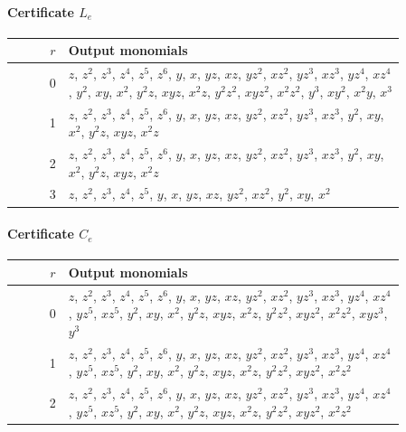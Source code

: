 \documentclass[11pt]{amsart}
\theoremstyle{definition}
\theoremstyle{remark}
\numberwithin{equation}{section}
\begin{document}
\paragraph*{Certificate $L_e$}
\begin{center}
\begin{tabular}{rp{0.86\linewidth}}
$r$ & Output monomials\\\hline
0 & \(z\), \(z^{2}\), \(z^{3}\), \(z^{4}\), \(z^{5}\), \(z^{6}\), \(y\), \(x\), \(yz\), \(xz\), \(yz^{2}\), \(xz^{2}\), \(yz^{3}\), \(xz^{3}\), \(yz^{4}\), \(xz^{4}\), \(y^{2}\), \(xy\), \(x^{2}\), \(y^{2}z\), \(xyz\), \(x^{2}z\), \(y^{2}z^{2}\), \(xyz^{2}\), \(x^{2}z^{2}\), \(y^{3}\), \(xy^{2}\), \(x^{2}y\), \(x^{3}\)\\
1 & \(z\), \(z^{2}\), \(z^{3}\), \(z^{4}\), \(z^{5}\), \(z^{6}\), \(y\), \(x\), \(yz\), \(xz\), \(yz^{2}\), \(xz^{2}\), \(yz^{3}\), \(xz^{3}\), \(y^{2}\), \(xy\), \(x^{2}\), \(y^{2}z\), \(xyz\), \(x^{2}z\)\\
2 & \(z\), \(z^{2}\), \(z^{3}\), \(z^{4}\), \(z^{5}\), \(z^{6}\), \(y\), \(x\), \(yz\), \(xz\), \(yz^{2}\), \(xz^{2}\), \(yz^{3}\), \(xz^{3}\), \(y^{2}\), \(xy\), \(x^{2}\), \(y^{2}z\), \(xyz\), \(x^{2}z\)\\
3 & \(z\), \(z^{2}\), \(z^{3}\), \(z^{4}\), \(z^{5}\), \(y\), \(x\), \(yz\), \(xz\), \(yz^{2}\), \(xz^{2}\), \(y^{2}\), \(xy\), \(x^{2}\)\\
\end{tabular}
\end{center}

\paragraph*{Certificate $C_e$}
\begin{center}
\begin{tabular}{rp{0.86\linewidth}}
$r$ & Output monomials\\\hline
0 & \(z\), \(z^{2}\), \(z^{3}\), \(z^{4}\), \(z^{5}\), \(z^{6}\), \(y\), \(x\), \(yz\), \(xz\), \(yz^{2}\), \(xz^{2}\), \(yz^{3}\), \(xz^{3}\), \(yz^{4}\), \(xz^{4}\), \(yz^{5}\), \(xz^{5}\), \(y^{2}\), \(xy\), \(x^{2}\), \(y^{2}z\), \(xyz\), \(x^{2}z\), \(y^{2}z^{2}\), \(xyz^{2}\), \(x^{2}z^{2}\), \(xyz^{3}\), \(y^{3}\)\\
1 & \(z\), \(z^{2}\), \(z^{3}\), \(z^{4}\), \(z^{5}\), \(z^{6}\), \(y\), \(x\), \(yz\), \(xz\), \(yz^{2}\), \(xz^{2}\), \(yz^{3}\), \(xz^{3}\), \(yz^{4}\), \(xz^{4}\), \(yz^{5}\), \(xz^{5}\), \(y^{2}\), \(xy\), \(x^{2}\), \(y^{2}z\), \(xyz\), \(x^{2}z\), \(y^{2}z^{2}\), \(xyz^{2}\), \(x^{2}z^{2}\)\\
2 & \(z\), \(z^{2}\), \(z^{3}\), \(z^{4}\), \(z^{5}\), \(z^{6}\), \(y\), \(x\), \(yz\), \(xz\), \(yz^{2}\), \(xz^{2}\), \(yz^{3}\), \(xz^{3}\), \(yz^{4}\), \(xz^{4}\), \(yz^{5}\), \(xz^{5}\), \(y^{2}\), \(xy\), \(x^{2}\), \(y^{2}z\), \(xyz\), \(x^{2}z\), \(y^{2}z^{2}\), \(xyz^{2}\), \(x^{2}z^{2}\)\\
\end{tabular}
\end{center}
\end{document}
